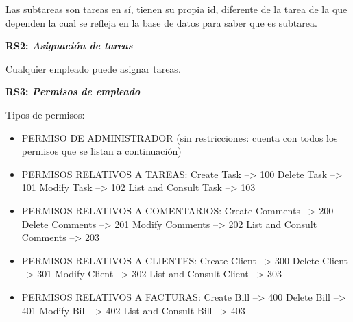 \documentclass[paper=a4, fontsize=11pt, spanish]{scrartcl}
\begin{document}
Las subtareas son tareas en sí, tienen su propia id, diferente de la tarea de la que dependen la cual se refleja en la base de datos para saber que es subtarea.

\setlength{\parindent}{0em}
\textbf{RS2: \textit{Asignación de tareas}}
\setlength{\parindent}{2em}

Cualquier empleado puede asignar tareas.

\setlength{\parindent}{0em}
\textbf{RS3: \textit{Permisos de empleado}}
\setlength{\parindent}{2em}

Tipos de permisos:
\begin{itemize}
\item PERMISO DE ADMINISTRADOR (sin restricciones: cuenta con todos los permisos que se listan a continuación)

\item PERMISOS RELATIVOS A TAREAS:
\newline	Create Task               --> 100
\newline	Delete Task               --> 101
\newline	Modify Task               --> 102
\newline	List and Consult Task     --> 103

\item PERMISOS RELATIVOS A COMENTARIOS:
\newline    Create Comments           --> 200
\newline    Delete Comments           --> 201
\newline    Modify Comments           --> 202
\newline    List and Consult Comments --> 203

\item PERMISOS RELATIVOS A CLIENTES:
\newline    Create Client             --> 300
\newline    Delete Client             --> 301
\newline    Modify Client             --> 302
\newline    List and Consult Client   --> 303

\item PERMISOS RELATIVOS A FACTURAS:
\newline    Create Bill               --> 400
\newline    Delete Bill               --> 401
\newline    Modify Bill               --> 402
\newline    List and Consult Bill     --> 403


\end{itemize}
\end{document}
